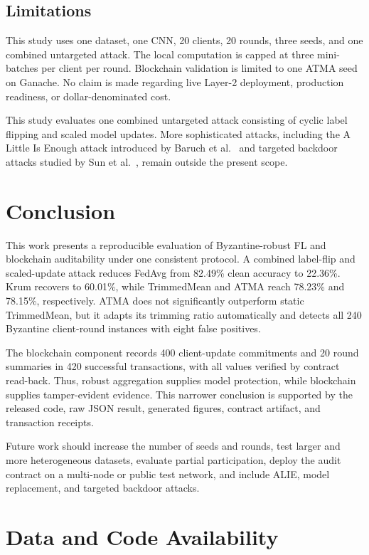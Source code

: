 \documentclass[10pt,letterpaper]{article}
\begin{document}
\subsection{Limitations}

This study uses one dataset, one CNN, 20 clients, 20 rounds, three seeds, and
one combined untargeted attack. The local computation is capped at three
mini-batches per client per round. Blockchain validation is limited to one
ATMA seed on Ganache. No claim is made regarding live Layer-2 deployment,
production readiness, or dollar-denominated cost.

This study evaluates one combined untargeted attack consisting of cyclic label
flipping and scaled model updates. More sophisticated attacks, including the A
Little Is Enough attack introduced by Baruch et al.~\cite{baruch2019} and
targeted backdoor attacks studied by Sun et al.~\cite{sun2019}, remain outside
the present scope.

\section{Conclusion}

This work presents a reproducible evaluation of Byzantine-robust FL and
blockchain auditability under one consistent protocol. A combined label-flip
and scaled-update attack reduces FedAvg from 82.49\% clean accuracy to 22.36\%.
Krum recovers to 60.01\%, while TrimmedMean and ATMA reach 78.23\% and 78.15\%,
respectively. ATMA does not significantly outperform static TrimmedMean, but it
adapts its trimming ratio automatically and detects all 240 Byzantine
client-round instances with eight false positives.

The blockchain component records 400 client-update commitments and 20 round
summaries in 420 successful transactions, with all values verified by contract
read-back. Thus, robust aggregation supplies model protection, while blockchain
supplies tamper-evident evidence. This narrower conclusion is supported by the
released code, raw JSON result, generated figures, contract artifact, and
transaction receipts.

Future work should increase the number of seeds and rounds, test larger and
more heterogeneous datasets, evaluate partial participation, deploy the audit
contract on a multi-node or public test network, and include ALIE, model
replacement, and targeted backdoor attacks.

\section*{Data and Code Availability}
\end{document}

